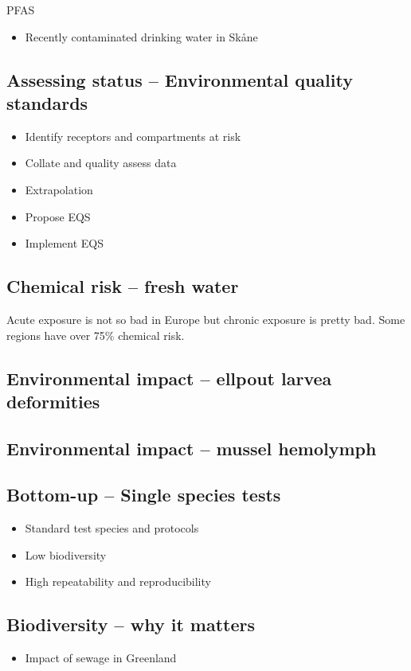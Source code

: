 PFAS
\begin{itemize}
	\item Recently contaminated drinking water in Skåne
\end{itemize}

\subsection{Assessing status -- Environmental quality standards}

\begin{itemize}
	\item Identify receptors and compartments at risk
	\item Collate and quality assess data
	\item Extrapolation
	\item Propose EQS
	\item Implement EQS
\end{itemize}

\subsection{Chemical risk -- fresh water}
Acute exposure is not so bad in Europe but chronic exposure is pretty bad.
Some regions have over 75\% chemical risk.

\subsection{Environmental impact -- ellpout larvea deformities}

\subsection{Environmental impact -- mussel hemolymph}

\subsection{Bottom-up -- Single species tests}
\begin{itemize}
	\item Standard test species and protocols
	\item Low biodiversity
	\item High repeatability and reproducibility
\end{itemize}

\subsection{Biodiversity -- why it matters}
\begin{itemize}
	\item Impact of sewage in Greenland
\end{itemize}

